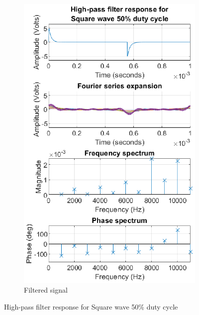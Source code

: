 \documentclass[notitlepage, a4paper, 11pt]{article}
\begin{document}
\begin{figure}[H]
\begin{subfigure}{0.45\textwidth}
			\includegraphics[width=\textwidth]{../Matlab/img/RCHPsqr50}
			\caption{Filtered signal}
		\end{subfigure}
		\caption{High-pass filter response for Square wave 50\% duty cycle}
	\end{figure}
\end{document}
